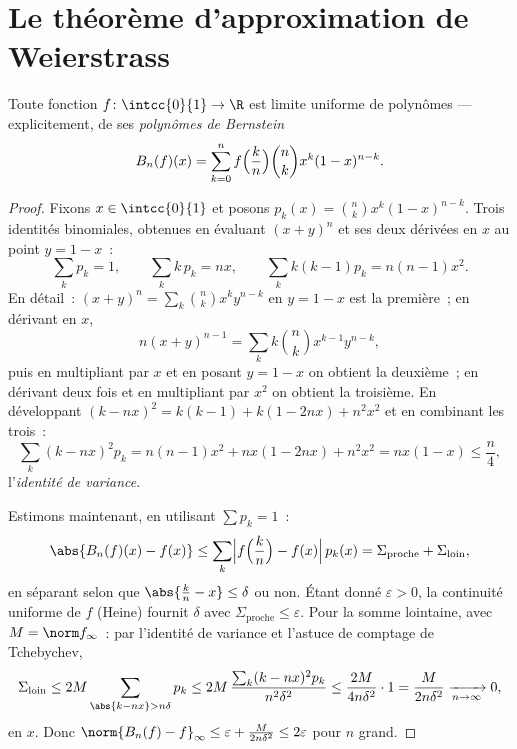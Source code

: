 \section{Le théorème d'approximation de Weierstrass}

\begin{theorem}\label{thm:b2:funcseq:weierstrass}
Toute fonction  $f \colon \intcc{0}{1} \to \R$ est limite
uniforme de polynômes --- explicitement, de ses \emph{polynômes de
Bernstein}
\[
B_n(f)(x) = \sum_{k=0}^{n} f\Bigl(\frac kn\Bigr)\binom nk x^k
(1-x)^{n-k} .
\]
\end{theorem}

\begin{proof}
Fixons $x \in \intcc{0}{1}$ et posons $p_k(x) = \binom nk x^k(1 -
x)^{n-k}$. Trois identités binomiales, obtenues en évaluant
$(x + y)^n$ et ses deux dérivées en $x$ au point $y = 1 - x$~:
\[
\sum_k p_k = 1,
\qquad
\sum_k k\,p_k = nx,
\qquad
\sum_k k(k-1) p_k = n(n-1)x^2 .
\]
En détail~: $(x+y)^n = \sum_k\binom nk x^ky^{n-k}$ en $y = 1-x$
est la première~; en dérivant en $x$,
\[
n(x+y)^{n-1} = \sum_k k\binom nk x^{k-1}y^{n-k} ,
\]
puis en multipliant par $x$ et en posant $y = 1 - x$ on obtient la
deuxième~; en dérivant deux fois et en multipliant par $x^2$ on
obtient la troisième. En développant $(k - nx)^2 = k(k-1) + k(1 - 2nx) +
n^2x^2$ et en combinant les trois~:
\[
\sum_k (k - nx)^2 p_k
= n(n-1)x^2 + nx(1 - 2nx) + n^2x^2
= nx(1 - x) \leq \frac n4 ,
\]
l'\emph{identité de variance}.

Estimons maintenant, en utilisant $\sum p_k = 1$~:
\[
\abs{B_n(f)(x) - f(x)}
\leq \sum_{k} \Bigl| f\Bigl(\frac kn\Bigr) - f(x)\Bigr|\, p_k(x)
= \Sigma_{\text{proche}} + \Sigma_{\text{loin}} ,
\]
en séparant selon que $\abs{\frac kn - x} \leq \delta$ ou non.
Étant donné $\varepsilon > 0$, la continuité uniforme de $f$ (Heine)
fournit $\delta$ avec $\Sigma_{\text{proche}} \leq \varepsilon$. Pour la
somme lointaine, avec $M = \norm f_\infty$~: par l'identité de variance
et l'astuce de comptage de Tchebychev,
\[
\Sigma_{\text{loin}} \leq 2M \sum_{\abs{k - nx} > n\delta} p_k
\leq 2M\,\frac{\sum_k (k - nx)^2 p_k}{n^2\delta^2}
\leq \frac{2M}{4 n \delta^2} \cdot 1
= \frac{M}{2n\delta^2}
\xrightarrow[n\to\infty]{} 0 ,
\]
 en $x$. Donc $\norm{B_n(f) - f}_\infty \leq \varepsilon +
\frac{M}{2n\delta^2} \leq 2\varepsilon$ pour $n$ grand.
\end{proof}

